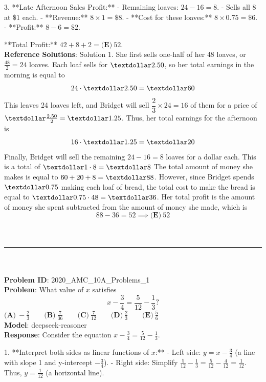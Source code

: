 {3. **Late Afternoon Sales Profit:**
   - Remaining loaves: \( 24 - 16 = 8 \).
   - Sells all 8 at \( \$1 \) each.
   - **Revenue:** \( 8 \times 1 = \$8 \).
   - **Cost for these loaves:** \( 8 \times 0.75 = \$6 \).
   - **Profit:** \( 8 - 6 = \$2 \).

**Total Profit:** \( 42 + 8 + 2 = \boxed{\textbf{(E)}\ 52} \). \\
    \textbf{Reference Solutions}: Solution 1. She first sells one-half of her $48$ loaves, or $\frac{48}{2}=24$ loaves. Each loaf sells for $\textdollar 2.50$, so her total earnings in the morning is equal to \[24\cdot \textdollar 2.50 = \textdollar 60\]
This leaves 24 loaves left, and Bridget will sell $\dfrac{2}{3}\times 24=16$ of them for a price of $\textdollar\frac{2.50}{2}=\textdollar 1.25$. Thus, her total earnings for the afternoon is \[16\cdot \textdollar 1.25  = \textdollar 20\]
Finally, Bridget will sell the remaining $24-16=8$ loaves for a dollar each. This is a total of $\textdollar 1\cdot 8 = \textdollar 8$
The total amount of money she makes is equal to $60+20+8=\textdollar 88$.
However, since Bridget spends $\textdollar 0.75$ making each loaf of bread, the total cost to make the bread is equal to  $\textdollar 0.75\cdot48=\textdollar 36$.
Her total profit is the amount of money she spent subtracted from the amount of money she made, which is \[88-36=52\implies\boxed{\textbf{(E)} \ 52}\] \\
    \vspace{0.3cm} \\
    \hrule \\
    \vspace{0.5cm} \\
    \textbf{Problem ID}: 2020_AMC_10A_Problems_1 \\
    \textbf{Problem}: What value of $x$ satisfies
\[x- \frac{3}{4} = \frac{5}{12} - \frac{1}{3}?\]
$\textbf{(A)}\ {-}\frac{2}{3}\qquad\textbf{(B)}\ \frac{7}{36}\qquad\textbf{(C)}\ \frac{7}{12}\qquad\textbf{(D)}\ \frac{2}{3}\qquad\textbf{(E)}\ \frac{5}{6}$ \\
    \textbf{Model}: deepseek-reasoner \\
    \textbf{Response}: Consider the equation \( x - \frac{3}{4} = \frac{5}{12} - \frac{1}{3} \). 

1. **Interpret both sides as linear functions of \( x \):**
   - Left side: \( y = x - \frac{3}{4} \) (a line with slope 1 and y-intercept \(-\frac{3}{4}\)).
   - Right side: Simplify \( \frac{5}{12} - \frac{1}{3} = \frac{5}{12} - \frac{4}{12} = \frac{1}{12} \). Thus, \( y = \frac{1}{12} \) (a horizontal line).

}

